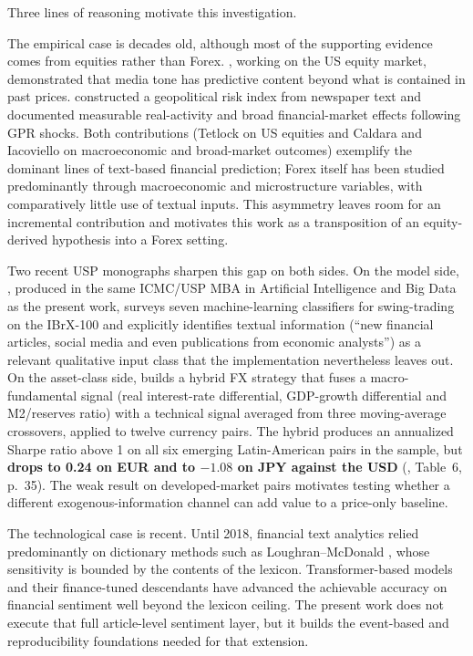 Three lines of reasoning motivate this investigation.

The empirical case is decades old, although most of the supporting evidence comes from equities rather than Forex. , working on the US equity market, demonstrated that media tone has predictive content beyond what is contained in past prices.  constructed a geopolitical risk index from newspaper text and documented measurable real-activity and broad financial-market effects following GPR shocks. Both contributions (Tetlock on US equities and Caldara and Iacoviello on macroeconomic and broad-market outcomes) exemplify the dominant lines of text-based financial prediction; Forex itself has been studied predominantly through macroeconomic and microstructure variables, with comparatively little use of textual inputs. This asymmetry leaves room for an incremental contribution and motivates this work as a transposition of an equity-derived hypothesis into a Forex setting.

Two recent USP monographs sharpen this gap on both sides. On the model side, , produced in the same ICMC/USP MBA in Artificial Intelligence and Big Data as the present work, surveys seven machine-learning classifiers for swing-trading on the IBrX-100 and explicitly identifies textual information (``new financial articles, social media and even publications from economic analysts'') as a relevant qualitative input class that the implementation nevertheless leaves out. On the asset-class side,  builds a hybrid FX strategy that fuses a macro-fundamental signal (real interest-rate differential, GDP-growth differential and M2/reserves ratio) with a technical signal averaged from three moving-average crossovers, applied to twelve currency pairs. The hybrid produces an annualized Sharpe ratio above 1 on all six emerging Latin-American pairs in the sample, but \textbf{drops to 0.24 on EUR and to $-1.08$ on JPY against the USD} (\citeauthor{vanhelden2021fx}, Table~6, p.~35). The weak result on developed-market pairs motivates testing whether a different exogenous-information channel can add value to a price-only baseline.

The technological case is recent. Until 2018, financial text analytics relied predominantly on dictionary methods such as Loughran--McDonald \cite{loughran2011liability}, whose sensitivity is bounded by the contents of the lexicon. Transformer-based models \cite{vaswani2017attention,devlin2019bert} and their finance-tuned descendants \cite{araci2019finbert,yang2020finbert,wu2023bloomberggpt,liu2023fingpt} have advanced the achievable accuracy on financial sentiment well beyond the lexicon ceiling. The present work does not execute that full article-level sentiment layer, but it builds the event-based and reproducibility foundations needed for that extension.


